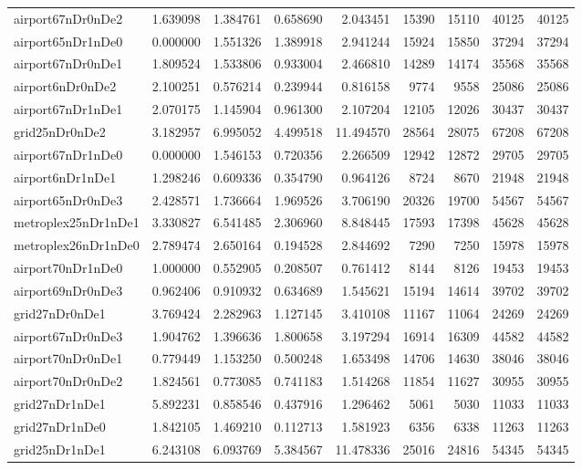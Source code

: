 \begin{longtable}{|l|r|r|r|r|r|r|r|r|}
airport67nDr0nDe2 & 1.639098 & 1.384761 & 0.658690 & 2.043451 & 15390 & 15110 & 40125 & 40125 \\
airport65nDr1nDe0 & 0.000000 & 1.551326 & 1.389918 & 2.941244 & 15924 & 15850 & 37294 & 37294 \\
airport67nDr0nDe1 & 1.809524 & 1.533806 & 0.933004 & 2.466810 & 14289 & 14174 & 35568 & 35568 \\
airport6nDr0nDe2 & 2.100251 & 0.576214 & 0.239944 & 0.816158 & 9774 & 9558 & 25086 & 25086 \\
airport67nDr1nDe1 & 2.070175 & 1.145904 & 0.961300 & 2.107204 & 12105 & 12026 & 30437 & 30437 \\
grid25nDr0nDe2 & 3.182957 & 6.995052 & 4.499518 & 11.494570 & 28564 & 28075 & 67208 & 67208 \\
airport67nDr1nDe0 & 0.000000 & 1.546153 & 0.720356 & 2.266509 & 12942 & 12872 & 29705 & 29705 \\
airport6nDr1nDe1 & 1.298246 & 0.609336 & 0.354790 & 0.964126 & 8724 & 8670 & 21948 & 21948 \\
airport65nDr0nDe3 & 2.428571 & 1.736664 & 1.969526 & 3.706190 & 20326 & 19700 & 54567 & 54567 \\
metroplex25nDr1nDe1 & 3.330827 & 6.541485 & 2.306960 & 8.848445 & 17593 & 17398 & 45628 & 45628 \\
metroplex26nDr1nDe0 & 2.789474 & 2.650164 & 0.194528 & 2.844692 & 7290 & 7250 & 15978 & 15978 \\
airport70nDr1nDe0 & 1.000000 & 0.552905 & 0.208507 & 0.761412 & 8144 & 8126 & 19453 & 19453 \\
airport69nDr0nDe3 & 0.962406 & 0.910932 & 0.634689 & 1.545621 & 15194 & 14614 & 39702 & 39702 \\
grid27nDr0nDe1 & 3.769424 & 2.282963 & 1.127145 & 3.410108 & 11167 & 11064 & 24269 & 24269 \\
airport67nDr0nDe3 & 1.904762 & 1.396636 & 1.800658 & 3.197294 & 16914 & 16309 & 44582 & 44582 \\
airport70nDr0nDe1 & 0.779449 & 1.153250 & 0.500248 & 1.653498 & 14706 & 14630 & 38046 & 38046 \\
airport70nDr0nDe2 & 1.824561 & 0.773085 & 0.741183 & 1.514268 & 11854 & 11627 & 30955 & 30955 \\
grid27nDr1nDe1 & 5.892231 & 0.858546 & 0.437916 & 1.296462 & 5061 & 5030 & 11033 & 11033 \\
grid27nDr1nDe0 & 1.842105 & 1.469210 & 0.112713 & 1.581923 & 6356 & 6338 & 11263 & 11263 \\
grid25nDr1nDe1 & 6.243108 & 6.093769 & 5.384567 & 11.478336 & 25016 & 24816 & 54345 & 54345 \\

\end{longtable}
